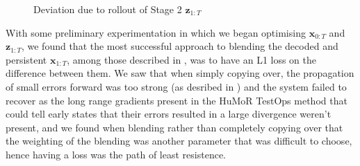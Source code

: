 \begin{figure}
    \centering
    \hfil
    \hfil
    \hfil
    \caption{Deviation due to rollout of Stage 2 $\mathbf{z}_{1:T}$}
    \label{fig:humor_stage_2_rollout_deviation}
\end{figure}


With some preliminary experimentation in which we began optimising $\mathbf{x}_{0:T}$ and $\mathbf{z}_{1:T}$, we found that the most successful approach to blending the decoded and persistent  $\mathbf{x}_{1:T}$, among those described in , was to have an L1 loss on the difference between them. We saw that when simply copying over, the propagation of small errors forward was too strong (as desribed in ) and the system failed to recover as the long range gradients present in the HuMoR TestOps method that could tell early states that their errors resulted in a large divergence weren't present, and we found when blending rather than completely copying over that the weighting of the blending was another parameter that was difficult to choose, hence having a loss was the path of least resistence.

